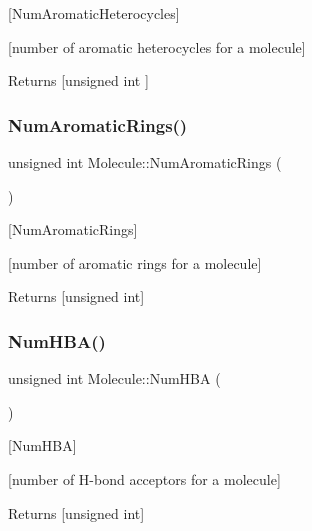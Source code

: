 \mbox{[}Num\+Aromatic\+Heterocycles\mbox{]} 

\mbox{[}number of aromatic heterocycles for a molecule\mbox{]}

\begin{DoxyReturn}{Returns}
\mbox{[}unsigned int \mbox{]} 
\end{DoxyReturn}
\mbox{\label{class_molecule_a76554ff4fee44adcd1a1ca15eb8e8a7b}} 
\subsubsection{\texorpdfstring{Num\+Aromatic\+Rings()}{NumAromaticRings()}}
{\footnotesize\ttfamily unsigned int Molecule\+::\+Num\+Aromatic\+Rings (\begin{DoxyParamCaption}{ }\end{DoxyParamCaption})}



\mbox{[}Num\+Aromatic\+Rings\mbox{]} 

\mbox{[}number of aromatic rings for a molecule\mbox{]}

\begin{DoxyReturn}{Returns}
\mbox{[}unsigned int\mbox{]} 
\end{DoxyReturn}
\mbox{\label{class_molecule_a932d2464d1d351fca8e72cd160bde74f}} 
\subsubsection{\texorpdfstring{Num\+H\+B\+A()}{NumHBA()}}
{\footnotesize\ttfamily unsigned int Molecule\+::\+Num\+H\+BA (\begin{DoxyParamCaption}{ }\end{DoxyParamCaption})}



\mbox{[}Num\+H\+BA\mbox{]} 

\mbox{[}number of H-\/bond acceptors for a molecule\mbox{]}

\begin{DoxyReturn}{Returns}
\mbox{[}unsigned int\mbox{]} 
\end{DoxyReturn}
\mbox{\label{class_molecule_a67cebe5aa58856c930fa1b162e592956}} 

